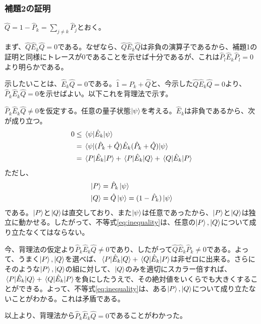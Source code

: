 \documentclass[uplatex,dvipdfmx, a4j]{jsarticle}
\newcommand{\ope}[1]{\hat{#1}}
\newcommand{\proj}{\ope{P}}
\begin{document}
\subsubsection{補題2の証明}
$\ope{Q} = 1-\proj_k = \sum_{j\neq k} \proj_j$とおく。

まず、$\ope{Q}\ope{E}_k\ope{Q} = 0$である。なぜなら、$\ope{Q}\ope{E}_k\ope{Q}$は非負の演算子であるから、補題1の証明と同様にトレースが0であることを示せば十分であるが、これは$\proj_l\ope{E}_k\proj_l = 0$より明らかである。

示したいことは、$\ope{E}_k\ope{Q}=0$である。$\ope{1} = \proj_k + \ope{Q}$と、今示した$\ope{Q}\ope{E}_k\ope{Q} = 0$より、 $\proj_k \ope{E}_k \ope{Q}=0$を示せばよい。以下これを背理法で示す。

$\proj_k \ope{E}_k \ope{Q}\neq0$を仮定する。任意の量子状態$\ket{\psi}$を考える。$\ope{E}_k$は非負であるから、次が成り立つ。
\begin{align}
	0 &\le \expval*{\ope{E}_k}{\psi} \\
	  &= \matrixelement*{\psi}{(\proj_k + \ope{Q})\ope{E}_k(\proj_k + \ope{Q})}{\psi} \\
	  &= \matrixelement*{P}{\ope{E}_k}{P} + \matrixelement*{P}{\ope{E}_k}{Q} + \matrixelement*{Q}{\ope{E}_k}{P} \label{eq:inequality}
\end{align}
ただし、
\begin{align}
	\ket{P} &= \proj_k \ket{\psi} \\
	\ket{Q} &= \ope{Q} \ket{\psi} = (1-\proj_k) \ket{\psi}
\end{align}
である。$\ket{P}$と$\ket{Q}$は直交しており、また$\ket{\psi}$は任意であったから、$\ket{P}$と$\ket{Q}$は独立に動かせる。したがって、不等式\eqref{eq:inequality}は、任意の$\ket{P},\ket{Q}$について成り立たなくてはならない。

今、背理法の仮定より$\proj_k \ope{E}_k \ope{Q}\neq0$であり、したがって$\ope{Q}\ope{E}_k\proj_k\neq0$である。よって、うまく$\ket{P},\ket{Q}$を選べば、$\matrixelement*{P}{\ope{E}_k}{Q} + \matrixelement*{Q}{\ope{E}_k}{P}$は非ゼロに出来る。さらにそのような$\ket{P},\ket{Q}$の組に対して、$\ket{Q}$のみを適切にスカラー倍すれば、$\matrixelement*{P}{\ope{E}_k}{Q} + \matrixelement*{Q}{\ope{E}_k}{P}$を負にしたうえで、その絶対値をいくらでも大きくすることができる。よって、不等式\eqref{eq:inequality}は、ある$\ket{P},\ket{Q}$について成り立たないことがわかる。これは矛盾である。

以上より、背理法から$\proj_k \ope{E}_k \ope{Q}=0$であることがわかった。
\end{document}

